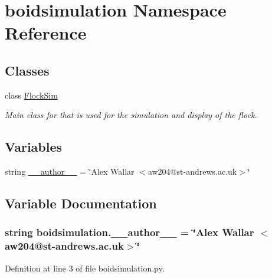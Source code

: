 \hypertarget{namespaceboidsimulation}{\section{boidsimulation Namespace Reference}
\label{namespaceboidsimulation}
}
\subsection*{Classes}
\begin{DoxyCompactItemize}
\item 
class \hyperlink{classboidsimulation_1_1FlockSim}{Flock\-Sim}
\begin{DoxyCompactList}\small\item\em Main class for that is used for the simulation and display of the flock. \end{DoxyCompactList}\end{DoxyCompactItemize}
\subsection*{Variables}
\begin{DoxyCompactItemize}
\item 
string \hyperlink{namespaceboidsimulation_a70f722357d7e5a4b5ac85e726863a7ef}{\-\_\-\-\_\-author\-\_\-\-\_\-} = \char`\"{}Alex Wallar $<$aw204@st-\/andrews.\-ac.\-uk$>$\char`\"{}
\end{DoxyCompactItemize}


\subsection{Variable Documentation}
\hypertarget{namespaceboidsimulation_a70f722357d7e5a4b5ac85e726863a7ef}{
\subsubsection[{\-\_\-\-\_\-author\-\_\-\-\_\-}]{\setlength{\rightskip}{0pt plus 5cm}string boidsimulation.\-\_\-\-\_\-author\-\_\-\-\_\- = \char`\"{}Alex Wallar $<$aw204@st-\/andrews.\-ac.\-uk$>$\char`\"{}}}\label{namespaceboidsimulation_a70f722357d7e5a4b5ac85e726863a7ef}


Definition at line 3 of file boidsimulation.\-py.

